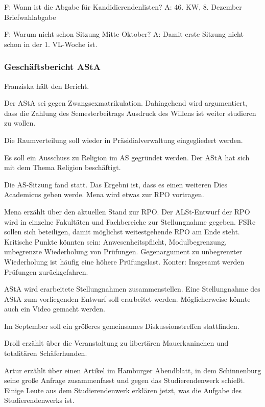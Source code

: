 \documentclass[ngerman,headheight=70pt]{scrartcl}
\begin{document}
    F: Wann ist die Abgabe für Kandidierendenlisten?
    A: 46. KW, 8. Dezember Briefwahlabgabe

    F: Warum nicht schon Sitzung Mitte Oktober?
    A: Damit erste Sitzung nicht schon in der 1. VL-Woche ist.

    \subsubsection{Geschäftsbericht AStA}

    Franziska hält den Bericht.

    Der AStA sei gegen Zwangsexmatrikulation. Dahingehend wird argumentiert, dass
    die Zahlung des Semesterbeitrags Ausdruck des Willens ist weiter studieren zu
    wollen.

    Die Raumverteilung soll wieder in Präsidialverwaltung eingegliedert werden.

    Es soll ein Ausschuss zu Religion im AS gegründet werden. Der AStA hat sich
    mit dem Thema Religion beschäftigt.

    Die AS-Sitzung fand statt. Das Ergebni ist, dass es einen weiteren Dies
    Academicus geben werde. Mena wird etwas zur RPO vortragen.

    Mena erzählt über den aktuellen Stand zur RPO. Der ALSt-Entwurf der RPO
    wird in einzelne Fakultäten und Fachbereiche zur Stellungnahme gegeben.
    FSRe sollen sich beteiligen, damit möglichst weitestgehende RPO
    am Ende steht. Kritische Punkte könnten sein: Anwesenheitspflicht,
    Modulbegrenzung, unbegrenzte Wiederholung von Prüfungen.
    Gegenargument zu unbegrenzter Wiederholung ist häufig eine höhere
    Prüfungslast. Konter: Insgesamt werden Prüfungen zurückgefahren.

    AStA wird erarbeitete Stellungnahmen zusammenstellen. Eine Stellungnahme
    des AStA zum vorliegenden Entwurf soll erarbeitet werden. Möglicherweise
    könnte auch ein Video gemacht werden.

    Im September soll ein größeres gemeinsames Diskussionstreffen stattfinden.

    Droll erzählt über die Veranstaltung zu libertären Mauerkaninchen und
    totalitären Schäferhunden.

    Artur erzählt über einen Artikel im Hamburger Abendblatt, in dem
    Schinnenburg seine große Anfrage zusammenfasst und gegen das Studierendenwerk
    schießt. Einige Leute aus dem Studierendenwerk erklären jetzt, was
    die Aufgabe des Studierendenwerks ist.
\end{document}
